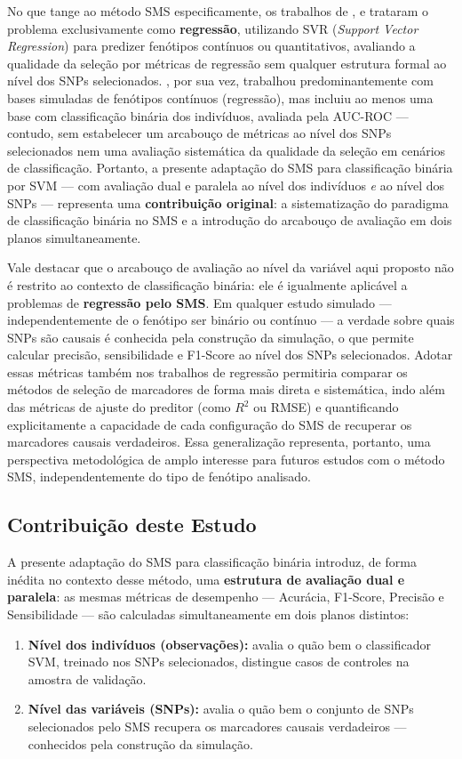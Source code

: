 \documentclass[
    12pt,
    a4paper,
    oneside,
    english,
    french,
    spanish,
    brazil
    ]{abntex2}
\newcommand{\novo}[1]{\textcolor{corNova}{#1}}
\begin{document}
\novo{No que tange ao método SMS especificamente, os trabalhos de \citeonline{de2014snps}, \citeonline{Souza2022} e \citeonline{Baptista2024} trataram o problema exclusivamente como \textbf{regressão}, utilizando SVR (\textit{Support Vector Regression}) para predizer fenótipos contínuos ou quantitativos, avaliando a qualidade da seleção por métricas de regressão sem qualquer estrutura formal ao nível dos SNPs selecionados. \citeonline{Oliveira2015}, por sua vez, trabalhou predominantemente com bases simuladas de fenótipos contínuos (regressão), mas incluiu ao menos uma base com classificação binária dos indivíduos, avaliada pela AUC-ROC --- contudo, sem estabelecer um arcabouço de métricas ao nível dos SNPs selecionados nem uma avaliação sistemática da qualidade da seleção em cenários de classificação. Portanto, a presente adaptação do SMS para classificação binária por SVM --- com avaliação dual e paralela ao nível dos indivíduos \emph{e} ao nível dos SNPs --- representa uma \textbf{contribuição original}: a sistematização do paradigma de classificação binária no SMS e a introdução do arcabouço de avaliação em dois planos simultaneamente.}

\novo{Vale destacar que o arcabouço de avaliação ao nível da variável aqui proposto não é restrito ao contexto de classificação binária: ele é igualmente aplicável a problemas de \textbf{regressão pelo SMS}. Em qualquer estudo simulado --- independentemente de o fenótipo ser binário ou contínuo --- a verdade sobre quais SNPs são causais é conhecida pela construção da simulação, o que permite calcular precisão, sensibilidade e F1-Score ao nível dos SNPs selecionados. Adotar essas métricas também nos trabalhos de regressão permitiria comparar os métodos de seleção de marcadores de forma mais direta e sistemática, indo além das métricas de ajuste do preditor (como $R^2$ ou RMSE) e quantificando explicitamente a capacidade de cada configuração do SMS de recuperar os marcadores causais verdadeiros. Essa generalização representa, portanto, uma perspectiva metodológica de amplo interesse para futuros estudos com o método SMS, independentemente do tipo de fenótipo analisado.}

\subsection*{Contribuição deste Estudo}

\novo{A presente adaptação do SMS para classificação binária introduz, de forma inédita no contexto desse método, uma \textbf{estrutura de avaliação dual e paralela}: as mesmas métricas de desempenho --- Acurácia, F1-Score, Precisão e Sensibilidade --- são calculadas simultaneamente em dois planos distintos:}
\begin{enumerate}
  \item \novo{\textbf{Nível dos indivíduos (observações):} avalia o quão bem o classificador SVM, treinado nos SNPs selecionados, distingue casos de controles na amostra de validação.}
  \item \novo{\textbf{Nível das variáveis (SNPs):} avalia o quão bem o conjunto de SNPs selecionados pelo SMS recupera os marcadores causais verdadeiros --- conhecidos pela construção da simulação.}
\end{enumerate}
\end{document}
